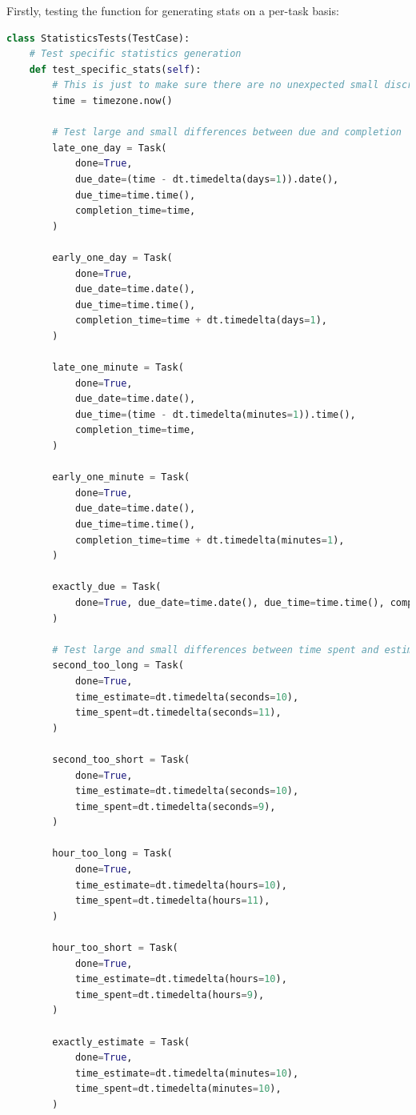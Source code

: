 \documentclass{article}
\begin{document}
Firstly, testing the function for generating stats on a per-task basis:
\begin{lstlisting}[language=Python]
class StatisticsTests(TestCase):
    # Test specific statistics generation
    def test_specific_stats(self):
        # This is just to make sure there are no unexpected small discretions in timings
        time = timezone.now()

        # Test large and small differences between due and completion
        late_one_day = Task(
            done=True,
            due_date=(time - dt.timedelta(days=1)).date(),
            due_time=time.time(),
            completion_time=time,
        )

        early_one_day = Task(
            done=True,
            due_date=time.date(),
            due_time=time.time(),
            completion_time=time + dt.timedelta(days=1),
        )

        late_one_minute = Task(
            done=True,
            due_date=time.date(),
            due_time=(time - dt.timedelta(minutes=1)).time(),
            completion_time=time,
        )

        early_one_minute = Task(
            done=True,
            due_date=time.date(),
            due_time=time.time(),
            completion_time=time + dt.timedelta(minutes=1),
        )

        exactly_due = Task(
            done=True, due_date=time.date(), due_time=time.time(), completion_time=time,
        )

        # Test large and small differences between time spent and estimated
        second_too_long = Task(
            done=True,
            time_estimate=dt.timedelta(seconds=10),
            time_spent=dt.timedelta(seconds=11),
        )

        second_too_short = Task(
            done=True,
            time_estimate=dt.timedelta(seconds=10),
            time_spent=dt.timedelta(seconds=9),
        )

        hour_too_long = Task(
            done=True,
            time_estimate=dt.timedelta(hours=10),
            time_spent=dt.timedelta(hours=11),
        )

        hour_too_short = Task(
            done=True,
            time_estimate=dt.timedelta(hours=10),
            time_spent=dt.timedelta(hours=9),
        )

        exactly_estimate = Task(
            done=True,
            time_estimate=dt.timedelta(minutes=10),
            time_spent=dt.timedelta(minutes=10),
        )


\end{lstlisting}
\end{document}
